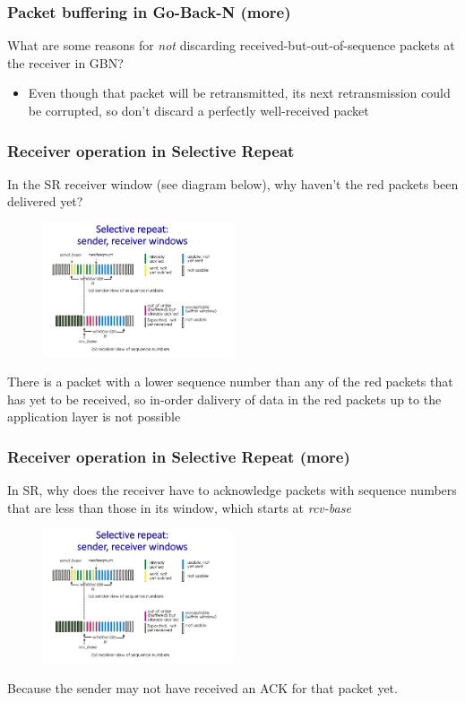    \subsubsection*{Packet buffering in Go-Back-N (more)}
    \noindent What are some reasons for \textit{not} discarding received-but-out-of-sequence packets at the receiver in GBN?
    \begin{itemize}
        \item Even though that packet will be retransmitted, its next retransmission could be corrupted, so don't discard
        a perfectly well-received packet
    \end{itemize}

    \subsubsection*{Receiver operation in Selective Repeat}
    \noindent In the SR receiver window (see diagram below), why haven't the red packets been delivered yet?
    \begin{figure}[H]
        \centering
        \includegraphics[width=0.5\textwidth]{img/3.4.13.jpg}
    \end{figure}
    There is a packet with a lower sequence number than any of the red packets that has yet to be received, so in-order dalivery
    of data in the red packets up to the application layer is not possible

    \subsubsection*{Receiver operation in Selective Repeat (more)}
    \noindent In SR, why does the receiver have to acknowledge packets with sequence numbers that are less than those in its 
    window, which starts at \textit{rcv-base}
    \begin{figure}[H]
        \centering
        \includegraphics[width=0.5\textwidth]{img/3.4.13.jpg}
    \end{figure}
    Because the sender may not have received an ACK for that packet yet.


